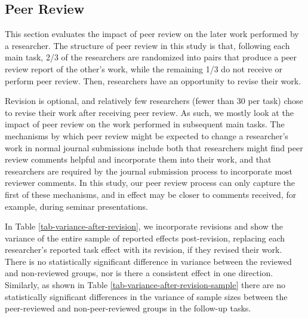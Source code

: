 \documentclass[
  letterpaper,
  DIV=11,
  numbers=noendperiod]{scrartcl}
\begin{document}
\subsection{Peer Review}\label{peer-review}

This section evaluates the impact of peer review on the later work
performed by a researcher. The structure of peer review in this study is
that, following each main task, 2/3 of the researchers are randomized
into pairs that produce a peer review report of the other's work, while
the remaining 1/3 do not receive or perform peer review. Then,
researchers have an opportunity to revise their work.

Revision is optional, and relatively few researchers (fewer than 30 per
task) chose to revise their work after receiving peer review. As such,
we mostly look at the impact of peer review on the work performed in
subsequent main tasks. The mechanisms by which peer review might be
expected to change a researcher's work in normal journal submissions
include both that researchers might find peer review comments helpful
and incorporate them into their work, and that researchers are required
by the journal submission process to incorporate most reviewer comments.
In this study, our peer review process can only capture the first of
these mechanisms, and in effect may be closer to comments received, for
example, during seminar presentations.

In Table \ref{tab-variance-after-revision}, we incorporate revisions and
show the variance of the entire sample of reported effects
post-revision, replacing each researcher's reported task effect with its
revision, if they revised their work. There is no statistically
significant difference in variance between the reviewed and non-reviewed
groups, nor is there a consistent effect in one direction. Similarly, as
shown in Table \ref{tab-variance-after-revision-sample} there are no
statistically significant differences in the variance of sample sizes
between the peer-reviewed and non-peer-reviewed groups in the follow-up
tasks.
\end{document}

